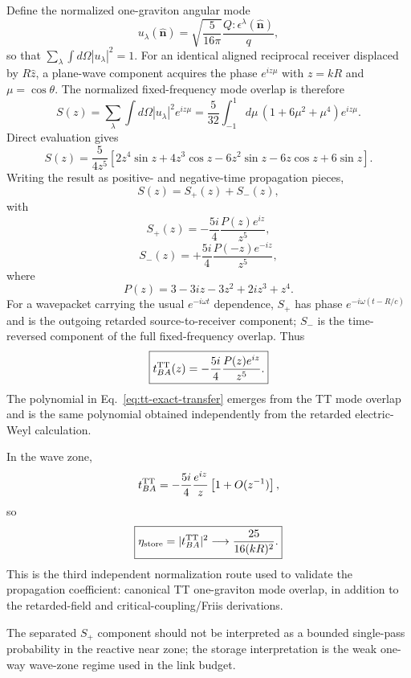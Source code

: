 Define the normalized one-graviton angular mode
\begin{equation}
\boxed{u_\lambda(\hat{\mathbf n})
=\sqrt{\frac{5}{16\pi}}
\frac{Q:\epsilon^\lambda(\hat{\mathbf n})}{q},}
\end{equation}
so that $\sum_\lambda\int d\Omega|u_\lambda|^2=1$. For an identical aligned reciprocal receiver displaced by $R\hat z$, a plane-wave component acquires the phase $e^{iz\mu}$ with $z=kR$ and $\mu=\cos\theta$. The normalized fixed-frequency mode overlap is therefore
\begin{equation}
S(z)
=\sum_\lambda\int d\Omega
|u_\lambda|^2e^{iz\mu}
=\frac{5}{32}\int_{-1}^{1}d\mu\,
(1+6\mu^2+\mu^4)e^{iz\mu}.
\label{eq:tt-overlap-integral}
\end{equation}
Direct evaluation gives
\begin{equation}
S(z)
=\frac{5}{4z^5}
\left[
2z^4\sin z+4z^3\cos z
-6z^2\sin z-6z\cos z+6\sin z
\right].
\end{equation}
Writing the result as positive- and negative-time propagation pieces,
\begin{equation}
S(z)=S_+(z)+S_-(z),
\end{equation}
with
\begin{equation}
\boxed{
S_+(z)
=-\frac{5i}{4}
\frac{P(z)e^{iz}}{z^5},}
\end{equation}
\begin{equation}
S_-(z)
=+\frac{5i}{4}
\frac{P(-z)e^{-iz}}{z^5},
\end{equation}
where
\begin{equation}
P(z)=3-3iz-3z^2+2iz^3+z^4.
\end{equation}
For a wavepacket carrying the usual $e^{-i\omega t}$ dependence, $S_+$ has phase $e^{-i\omega(t-R/c)}$ and is the outgoing retarded source-to-receiver component; $S_-$ is the time-reversed component of the full fixed-frequency overlap. Thus
\begin{equation}
\boxed{
t_{BA}^{\rm TT}(z)
=-\frac{5i}{4}
\frac{P(z)e^{iz}}{z^5}.}
\label{eq:tt-exact-transfer}
\end{equation}
The polynomial in Eq.~\eqref{eq:tt-exact-transfer} emerges from the TT mode overlap and is the same polynomial obtained independently from the retarded electric-Weyl calculation.

In the wave zone,
\begin{equation}
t_{BA}^{\rm TT}
=-\frac{5i}{4}\frac{e^{iz}}{z}
\left[1+O(z^{-1})\right],
\end{equation}
so
\begin{equation}
\boxed{
\eta_{\rm store}
=|t_{BA}^{\rm TT}|^2
\longrightarrow
\frac{25}{16(kR)^2}.}
\end{equation}
This is the third independent normalization route used to validate the propagation coefficient: canonical TT one-graviton mode overlap, in addition to the retarded-field and critical-coupling/Friis derivations.

The separated $S_+$ component should not be interpreted as a bounded single-pass probability in the reactive near zone; the storage interpretation is the weak one-way wave-zone regime used in the link budget.
